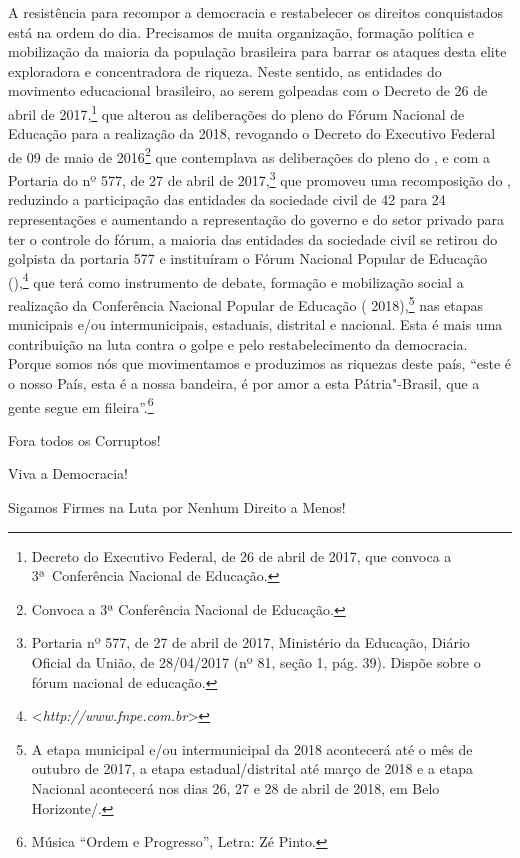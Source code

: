 A resistência para recompor a democracia e restabelecer os direitos
conquistados está na ordem do dia. Precisamos de muita organização,
formação política e mobilização da maioria da população brasileira para
barrar os ataques desta elite exploradora e concentradora de riqueza.
Neste sentido, as entidades do movimento educacional brasileiro, ao
serem golpeadas com o Decreto de 26 de abril de 2017,\footnote{Decreto
  do Executivo Federal, de 26 de abril de 2017, que convoca a
  3ª~Conferência Nacional de Educação.} que alterou as
deliberações do pleno do Fórum Nacional de Educação para a realização da
 2018, revogando o Decreto do Executivo Federal de 09 de maio de
2016\footnote{Convoca a 3ª Conferência Nacional de Educação.} que contemplava
as deliberações do pleno do , e com a Portaria do  nº 577, de 27
de abril de 2017,\footnote{Portaria nº 577, de 27 de abril de
  2017, Ministério da Educação, Diário Oficial da União, de 28/04/2017
  (nº 81, seção 1, pág. 39). Dispõe sobre o fórum nacional de
  educação.}
que promoveu uma recomposição do , reduzindo a participação das
entidades da sociedade civil de 42 para 24 representações e aumentando a
representação do governo e do setor privado para ter o controle do
fórum, a maioria das entidades da sociedade civil se retirou do 
golpista da portaria 577 e instituíram o Fórum Nacional Popular de
Educação (),\footnote{\textless{}\emph{http://www.fnpe.com.br}\textgreater{}}
que terá como instrumento de debate, formação e mobilização social a
realização da Conferência Nacional Popular de Educação (
2018),\footnote{A etapa municipal e/ou intermunicipal da 
  2018 acontecerá até o mês de outubro de 2017, a etapa
  estadual/distrital até março de 2018 e a etapa Nacional acontecerá nos
  dias 26, 27 e 28 de abril de 2018, em Belo Horizonte/.} nas etapas
municipais e/ou intermunicipais, estaduais, distrital e nacional. Esta é
mais uma contribuição na luta contra o golpe e pelo restabelecimento da
democracia. Porque somos nós que movimentamos e produzimos as riquezas
deste país, ``este é o nosso País, esta é a nossa bandeira, é por amor a
esta Pátria"-Brasil, que a gente segue em fileira''.\footnote{Música ``Ordem
  e Progresso'', Letra: Zé Pinto.}

Fora todos os Corruptos!

Viva a Democracia!

Sigamos Firmes na Luta por Nenhum Direito a Menos!
